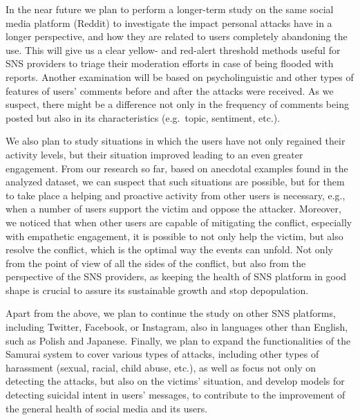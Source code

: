 \documentclass[a4paper,fleqn]{cas-dc}
\begin{document}
In the near future we plan to perform a longer-term study on the same
social media platform (Reddit) to investigate the impact personal
attacks have in a longer perspective, and how they are related to users
completely abandoning the use. This will give us a clear yellow- and
red-alert threshold methods useful for SNS providers to triage their
moderation efforts in case of being flooded with reports. Another
examination will be based on psycholinguistic and other types of
features of users' comments before and after the attacks were received.
As we suspect, there might be a difference not only in the frequency of
comments being posted but also in its characteristics (e.g.~topic,
sentiment, etc.).

We also plan to study situations in which the users have not only
regained their activity levels, but their situation improved leading to
an even greater engagement. From our research so far, based on anecdotal
examples found in the analyzed dataset, we can suspect that such
situations are possible, but for them to take place a helping and
proactive activity from other users is necessary, e.g., when a number of
users support the victim and oppose the attacker. Moreover, we noticed
that when other users are capable of mitigating the conflict, especially
with empathetic engagement, it is possible to not only help the victim,
but also resolve the conflict, which is the optimal way the events can
unfold. Not only from the point of view of all the sides of the
conflict, but also from the perspective of the SNS providers, as keeping
the health of SNS platform in good shape is crucial to assure its
sustainable growth and stop depopulation.

Apart from the above, we plan to continue the study on other SNS
platforms, including Twitter, Facebook, or Instagram, also in languages
other than English, such as Polish and Japanese. Finally, we plan to
expand the functionalities of the \textsf{ Samurai} system to cover
various types of attacks, including other types of harassment (sexual,
racial, child abuse, etc.), as well as focus not only on detecting the
attacks, but also on the victims' situation, and develop models for
detecting suicidal intent in users' messages, to contribute to the
improvement of the general health of social media and its users.




\end{document}
